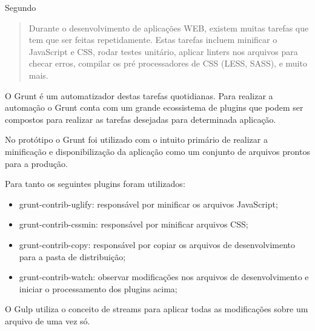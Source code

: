 Segundo \cite{gruntTutorial}
\begin{quote}
Durante o desenvolvimento de aplicações WEB, existem muitas tarefas
que tem que ser feitas repetidamente. Estas tarefas incluem minificar o
JavaScript e CSS, rodar testes unitário, aplicar linters nos arquivos
para checar erros, compilar os pré processadores de CSS (LESS, SASS), e
muito mais.
\end{quote}

O Grunt é um automatizador destas tarefas quotidianas. Para realizar
a automação o Grunt conta com um grande ecossistema de plugins que
podem ser compostos para realizar as tarefas desejadas para determinada
aplicação.

No protótipo o Grunt foi utilizado com o intuito primário de realizar
a minificação e disponibilização da aplicação como um conjunto de
arquivos prontos para a produção.

Para tanto os seguintes plugins foram utilizados:

\begin{itemize}
    \item grunt-contrib-uglify: responsável por minificar os arquivos JavaScript;
    \item grunt-contrib-cssmin: responsável por minificar arquivos CSS;
    \item grunt-contrib-copy: responsável por copiar os arquivos de desenvolvimento para a pasta de distribuição;
    \item grunt-contrib-watch: observar modificações nos arquivos de desenvolvimento e iniciar o processamento dos plugins acima;
\end{itemize}

O Gulp utiliza o conceito de streams para aplicar todas as modificações sobre
um arquivo de uma vez só.



